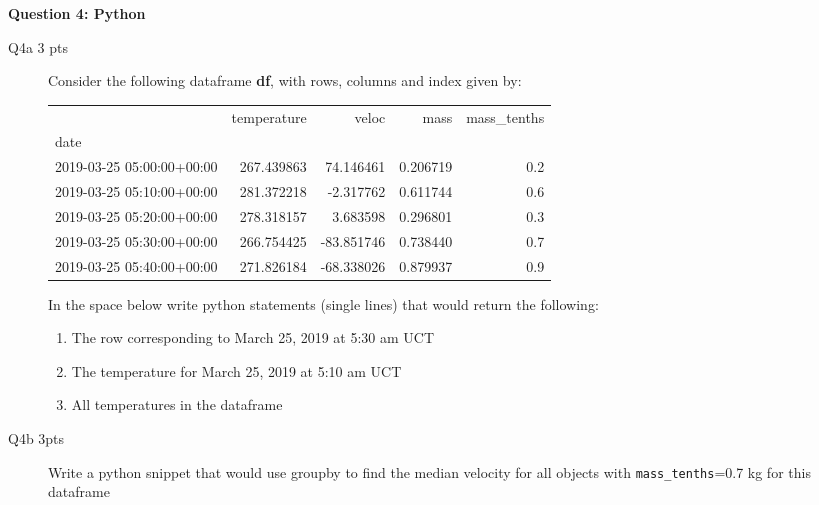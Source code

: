 \documentclass{article}
\begin{document}
\newpage
\textbf{Question 4: Python}
\begin{description}
\item[Q4a 3 pts] Consider the following dataframe \textbf{df}, with rows, columns and index given by:

\begin{tabular}{lrrrr}
\toprule
{} &  temperature &      veloc &      mass &  mass\_tenths \\
date                      &              &            &           &              \\
\midrule
2019-03-25 05:00:00+00:00 &   267.439863 &  74.146461 &  0.206719 &          0.2 \\
2019-03-25 05:10:00+00:00 &   281.372218 &  -2.317762 &  0.611744 &          0.6 \\
2019-03-25 05:20:00+00:00 &   278.318157 &   3.683598 &  0.296801 &          0.3 \\
2019-03-25 05:30:00+00:00 &   266.754425 & -83.851746 &  0.738440 &          0.7 \\
2019-03-25 05:40:00+00:00 &   271.826184 & -68.338026 &  0.879937 &          0.9 \\
\bottomrule
\end{tabular}

In the space below write python statements (single lines) that would
return the following:

\begin{enumerate}
\item The row corresponding to March 25, 2019 at 5:30 am UCT
\item The temperature for March 25, 2019 at 5:10 am UCT
\item All temperatures in the dataframe
\end{enumerate}

\vspace{4cm}

\item[Q4b 3pts] Write a python snippet that would use groupby to find
  the median velocity for all objects with \verb+mass_tenths+=0.7 kg for this
  dataframe
  
\end{description}
\end{document}
